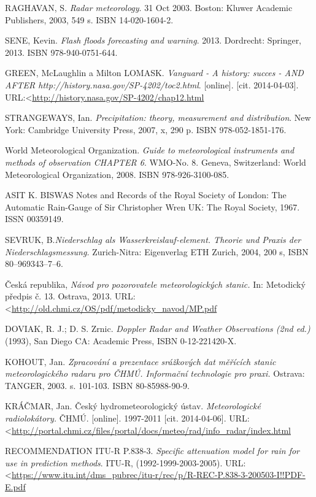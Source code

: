 \documentclass[a4paper,12pt]{article}
\renewcommand\baselinestretch{1.3}
\begin{document}
\newpage
\renewcommand\baselinestretch{1.2}
\selectfont
\renewcommand{\refname}{Použité zdroje}
\addcontentsline{toc}{section}{\refname}

\begin{thebibliography}{99}
\label{literatura}




RAGHAVAN, S. \textit {Radar meteorology}.
31 Oct 2003. Boston: Kluwer Academic Publishers, 2003, 549 s. ISBN 14-020-1604-2. 

SENE, Kevin. \textit {Flash floods forecasting and warning}.
2013. Dordrecht: Springer, 2013. ISBN 978-940-0751-644. 

GREEN, McLaughlin a Milton LOMASK. \textit {Vanguard - A history: succes - AND AFTER http://history.nasa.gov/SP-4202/toc2.html}.
[online]. [cit. 2014-04-03]. URL:\textless\url {http://history.nasa.gov/SP-4202/chap12.html}

STRANGEWAYS, Ian.  \textit {Precipitation: theory, measurement and distribution}.
New York: Cambridge University Press, 2007, x, 290 p. ISBN 978-052-1851-176. 

World Meteorological Organization. \textit{Guide to meteorological instruments and methods of observation CHAPTER 6}. WMO-No. 8. Geneva, Switzerland: World Meteorological Organization, 2008. ISBN 978-926-3100-085. 

ASIT K. BISWAS {Notes and Records of the Royal Society of London: The Automatic Rain-Gauge of Sir Christopher Wren} UK: The Royal Society, 1967. ISSN 00359149. 

SEVRUK, B.\textit{Niederschlag als Wasserkreislauf-element. Theorie und Praxis der Niederschlagsmessung.} 
Zurich-Nitra: Eigenverlag ETH Zurich,  2004, 200 s, ISBN 80–969343–7–6.

Česká republika, \textit{Návod pro pozorovatele meteorologických stanic.}
In: Metodický předpis č. 13. Ostrava, 2013. URL:\textless\url {http://old.chmi.cz/OS/pdf/metodicky_navod/MP.pdf}


DOVIAK, R. J.; D. S. Zrnic. \textit{Doppler Radar and Weather Observations (2nd ed.)}
(1993), San Diego CA: Academic Press, ISBN 0-12-221420-X.

KOHOUT, Jan. \textit{Zpracování a prezentace srážkových dat měřících stanic meteorologického radaru pro ČHMÚ. Informační technologie pro praxi.}
Ostrava: TANGER, 2003. s. 101-103. ISBN 80-85988-90-9.

KRÁČMAR, Jan. Český hydrometeorologický ústav. \textit{Meteorologické radiolokátory.} ČHMÚ.
[online]. 1997-2011 [cit. 2014-04-06]. URL:\textless\url {http://portal.chmi.cz/files/portal/docs/meteo/rad/info_radar/index.html}

RECOMMENDATION ITU-R P.838-3. \textit{Specific attenuation model for rain for use in prediction methods}. 
ITU-R, (1992-1999-2003-2005). URL:\textless\url {https://www.itu.int/dms_pubrec/itu-r/rec/p/R-REC-P.838-3-200503-I!!PDF-E.pdf}




\end{thebibliography}
\end{document}
